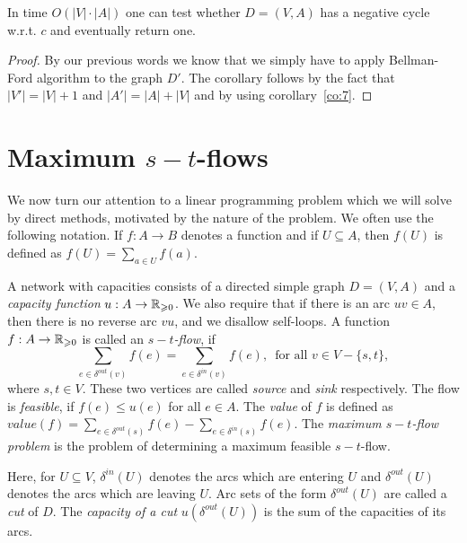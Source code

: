 \begin{corollary}
  \label{co:9}
  In time $O(|V| \cdot |A| )$  one can test whether $D = (V,A)$ has a
  negative cycle w.r.t. $c$ and eventually return one. 
\end{corollary}

\begin{proof}
   By our previous words we know that we simply have to apply 
   Bellman-Ford algorithm to the graph $D'$. The corollary follows 
   by the fact that $|V'| = |V|+1$ and $|A'| = |A| + |V|$ and by 
   using corollary~\ref{co:7}.
\end{proof}

\section{Maximum $s-t$-flows}
\label{sec:maximum-s-t}

We now turn our attention to a linear programming problem which we
will solve by direct methods, motivated by the nature of the 
problem. We often use the following notation. If $f:A\longrightarrow B$ denotes a
function and if $U\subseteq A$, then $f(U)$ is defined as $f(U)= \sum_{a\in U}
f(a)$.  




\begin{definition}
  A network with capacities  consists of a directed simple graph
  $D=(V,A)$ and a   \emph{capacity function} $u:A\to\mathbb{R}_{\geqslant0}$. 
  We also require that if there is an arc $uv \in A$, then there is 
  no reverse arc $vu$, and we disallow self-loops. 
  A function $f:A\to\mathbb{R}_{\geqslant0}$ is   called an \emph{$s-t$-flow}, if 
  \begin{equation}
    \sum_{e \in \delta^{out}(v)} f(e) = \sum_{e \in \delta^{in}(v)} f(e), \, \mbox{ for all } v \in V - \{s,t\},
  \end{equation}
  where $s,t\in V$. These two vertices are called \emph{source} and 
  \emph{sink} respectively. 
  The flow is \emph{feasible}, if $f(e) \leq u(e)$ for all
  $e \in A$. 
  The \emph{value} of $f$ is defined as 
  $value(f) =  \sum_{e \in \delta^{out}(s)} f(e) - \sum_{e \in \delta^{in}(s)} f(e)$.
  The \emph{maximum $s-t$-flow problem} is the problem of determining
  a maximum feasible $s-t$-flow. 
\end{definition}


Here, for $U \subseteq V$, $\delta^{in}(U)$ denotes the arcs which are entering $U$
and $\delta^{out}(U)$ denotes the arcs which are leaving $U$.   Arc sets
of the form $\delta^{out}(U)$   are called a \emph{cut} of $D$. The
\emph{capacity of a cut } $u(\delta^{out}(U))$ is the sum of the capacities of
its arcs. 


